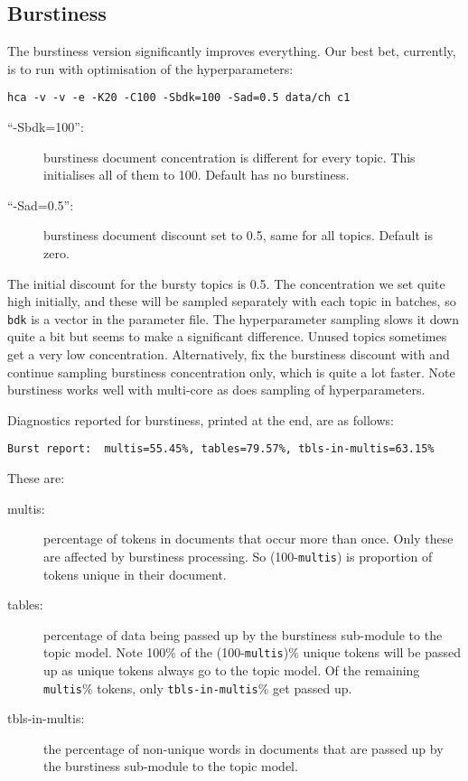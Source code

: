 \documentclass[a4paper,english]{article}
\begin{document}
\subsection{Burstiness}

The burstiness version significantly improves everything.
Our best bet, currently, is to run
with optimisation of the hyperparameters:
\begin{verbatim}
hca -v -v -e -K20 -C100 -Sbdk=100 -Sad=0.5 data/ch c1
\end{verbatim}
\begin{description}
\item[``-Sbdk=100'':]  burstiness document concentration is different
for every topic.  This initialises all of them to 100.
Default has no burstiness.
\item[``-Sad=0.5'':] burstiness document discount set to 
0.5, same for all topics.  Default is zero.
\end{description}
The initial discount for the bursty topics is
0.5.   The concentration we set quite high initially, 
and these will be sampled separately with
each topic in batches, so \texttt{bdk} is a vector in the
parameter file.
The hyperparameter sampling slows it down quite a bit but seems to
make a significant difference.  Unused topics sometimes
get a very low concentration.
Alternatively, fix the burstiness discount with 
 and continue sampling burstiness concentration only,
which is quite a lot faster.
Note burstiness works well with multi-core as does 
sampling of hyperparameters.

Diagnostics reported for burstiness, printed at the end, are as follows:
\begin{verbatim}
Burst report:  multis=55.45%, tables=79.57%, tbls-in-multis=63.15%
\end{verbatim}
These are:
\begin{description}
\item[multis:] percentage of tokens in documents that occur more than
once.  Only these are affected by burstiness processing. 
So (100-\texttt{multis}) is proportion of tokens unique in
their document.  
\item[tables:] percentage of data being passed up by the burstiness
sub-module to the topic model.  
Note 100\% of the  (100-\texttt{multis})\% unique tokens will
be passed up as unique tokens always go to the topic model.
Of the remaining \texttt{multis}\% tokens, only 
\texttt{tbls-in-multis}\% get passed up.
\item[tbls-in-multis:] the percentage of 
non-unique words in documents that are passed up by the burstiness
sub-module to the topic model.  
\end{description}
\end{document}
